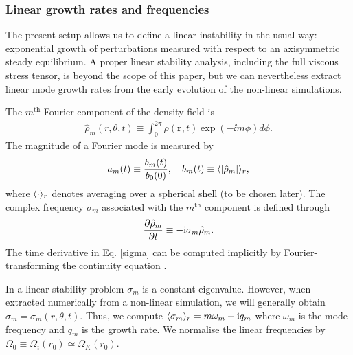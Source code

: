 \subsubsection{Linear growth rates and frequencies}
The present setup allows us to define a linear instability in the
usual way: exponential growth of perturbations measured with respect
to an axisymmetric steady equilibrium. A proper linear
stability analysis, including the full viscous stress tensor, is
beyond the scope of this paper, but we can nevertheless extract linear 
mode growth rates from the early evolution of the non-linear simulations.  

The $m^\mathrm{th}$ Fourier component of the density field is  
\begin{align}
\hat{\rho}_m(r,\theta,t) \equiv \int_0^{2\pi} \rho(\bm{r},t)\exp{(-\ii m\phi)}d\phi.
\end{align}
The magnitude of a Fourier mode is measured by 
\begin{align} 
a_m(t)\equiv \frac{b_m(t)}{b_0(0)},\quad b_m(t)\equiv \langle |\hat{\rho}_m| \rangle_r,
\end{align} 
where $\langle \cdot \rangle_r$ denotes averaging over a spherical shell (to be
chosen later). 
The complex frequency $\sigma_m$ associated with the $m^\mathrm{th}$ component 
is defined through 
\begin{align}\label{sigma}
  \frac{\partial\hat{\rho}_m}{\partial t} \equiv -\mathrm{i}\sigma_m\hat{\rho}_m. 
\end{align}
The time derivative in Eq. \ref{sigma} can be computed implicitly by 
Fourier-transforming the continuity equation \citep[as done
  in][]{lin13}. 


In a linear stability problem $\sigma_m$ is a constant eigenvalue. 
However, when extracted numerically from a non-linear simulation, 
we will generally obtain $\sigma_m=\sigma_m(r,\theta,t)$. Thus, we compute 
$\langle \sigma_m \rangle_r = m\omega_m + \mathrm{i} q_m$    
where $\omega_m$ is the mode frequency and $q_m$ is the growth rate.
We normalise the linear frequencies by
$\Omega_0\equiv\Omega_i(r_0)\simeq\Omega_K(r_0)$. 

